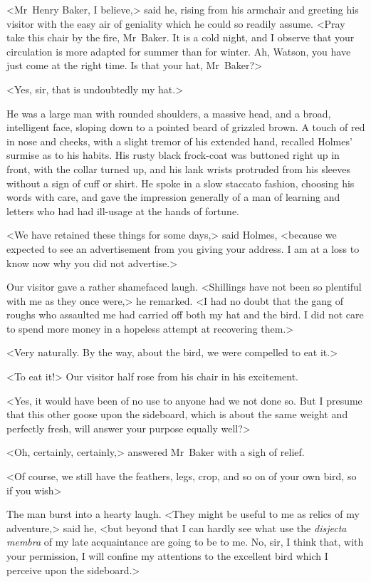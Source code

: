 <Mr~Henry Baker, I believe,> said he, rising from his armchair and greeting his visitor with the easy air of geniality which he could so readily assume. <Pray take this chair by the fire, Mr~Baker. It is a cold night, and I observe that your circulation is more adapted for summer than for winter. Ah, Watson, you have just come at the right time. Is that your hat, Mr~Baker?>

<Yes, sir, that is undoubtedly my hat.>

He was a large man with rounded shoulders, a massive head, and a broad, intelligent face, sloping down to a pointed beard of grizzled brown. A touch of red in nose and cheeks, with a slight tremor of his extended hand, recalled Holmes' surmise as to his habits. His rusty black frock-coat was buttoned right up in front, with the collar turned up, and his lank wrists protruded from his sleeves without a sign of cuff or shirt. He spoke in a slow staccato fashion, choosing his words with care, and gave the impression generally of a man of learning and letters who had had ill-usage at the hands of fortune.

<We have retained these things for some days,> said Holmes, <because we expected to see an advertisement from you giving your address. I am at a loss to know now why you did not advertise.>

Our visitor gave a rather shamefaced laugh. <Shillings have not been so plentiful with me as they once were,> he remarked. <I had no doubt that the gang of roughs who assaulted me had carried off both my hat and the bird. I did not care to spend more money in a hopeless attempt at recovering them.>

<Very naturally. By the way, about the bird, we were compelled to eat it.>

<To eat it!> Our visitor half rose from his chair in his excitement.

<Yes, it would have been of no use to anyone had we not done so. But I presume that this other goose upon the sideboard, which is about the same weight and perfectly fresh, will answer your purpose equally well?>

<Oh, certainly, certainly,> answered Mr~Baker with a sigh of relief.

<Of course, we still have the feathers, legs, crop, and so on of your own bird, so if you wish\longdash>

The man burst into a hearty laugh. <They might be useful to me as relics of my adventure,> said he, <but beyond that I can hardly see what use the \textit{disjecta membra} of my late acquaintance are going to be to me. No, sir, I think that, with your permission, I will confine my attentions to the excellent bird which I perceive upon the sideboard.>

